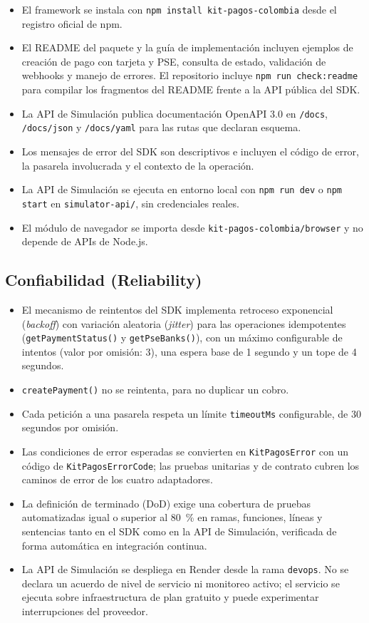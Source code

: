 \begin{itemize}
  \item El framework se instala con \texttt{npm install kit-pagos-colombia} desde el registro oficial de npm.
  \item El README del paquete y la guía de implementación incluyen ejemplos de creación de pago con tarjeta y PSE, consulta de estado, validación de webhooks y manejo de errores. El repositorio incluye \texttt{npm run check:readme} para compilar los fragmentos del README frente a la API pública del SDK.
  \item La API de Simulación publica documentación OpenAPI 3.0 en \texttt{/docs}, \texttt{/docs/json} y \texttt{/docs/yaml} para las rutas que declaran esquema.
  \item Los mensajes de error del SDK son descriptivos e incluyen el código de error, la pasarela involucrada y el contexto de la operación.
  \item La API de Simulación se ejecuta en entorno local con \texttt{npm run dev} o \texttt{npm start} en \texttt{simulator-api/}, sin credenciales reales.
  \item El módulo de navegador se importa desde \texttt{kit-pagos-colombia/browser} y no depende de APIs de Node.js.
\end{itemize}

\subsection{Confiabilidad (Reliability)}

\begin{itemize}
  \item El mecanismo de reintentos del SDK implementa retroceso exponencial (\textit{backoff}) con variación aleatoria (\textit{jitter}) para las operaciones idempotentes (\texttt{getPaymentStatus()} y \texttt{getPseBanks()}), con un máximo configurable de intentos (valor por omisión: 3), una espera base de 1 segundo y un tope de 4 segundos.
  \item \texttt{createPayment()} no se reintenta, para no duplicar un cobro.
  \item Cada petición a una pasarela respeta un límite \texttt{timeoutMs} configurable, de 30 segundos por omisión.
  \item Las condiciones de error esperadas se convierten en \texttt{KitPagosError} con un código de \texttt{KitPagosErrorCode}; las pruebas unitarias y de contrato cubren los caminos de error de los cuatro adaptadores.
  \item La definición de terminado (DoD) exige una cobertura de pruebas automatizadas igual o superior al 80~\% en ramas, funciones, líneas y sentencias tanto en el SDK como en la API de Simulación, verificada de forma automática en integración continua.
  \item La API de Simulación se despliega en Render desde la rama \texttt{devops}. No se declara un acuerdo de nivel de servicio ni monitoreo activo; el servicio se ejecuta sobre infraestructura de plan gratuito y puede experimentar interrupciones del proveedor.
\end{itemize}

